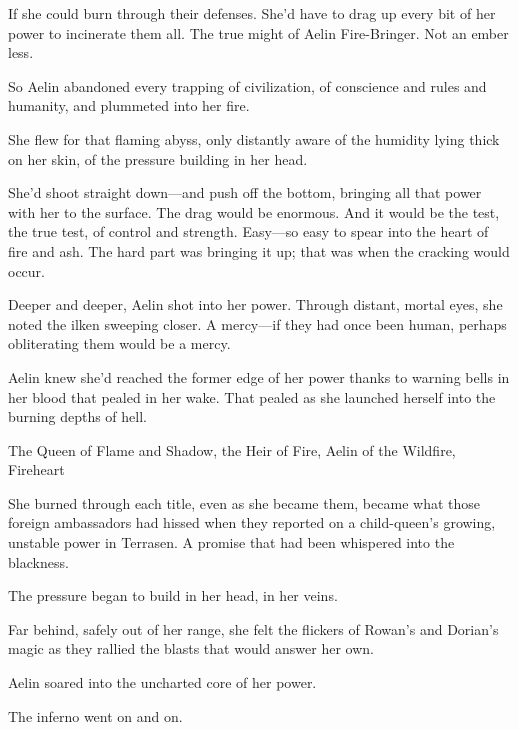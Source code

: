 If she could burn through their defenses.
She'd have to drag up every bit of her power to incinerate them all.
The true might of Aelin Fire-Bringer.
Not an ember less.

So Aelin abandoned every trapping of civilization, of conscience and rules and humanity, and plummeted into her fire.

She flew for that flaming abyss, only distantly aware of the humidity lying thick on her skin, of the pressure building in her head.

She'd shoot straight down---and push off the bottom, bringing all that power with her to the surface.
The drag would be enormous.
And it would be the test, the true test, of control and strength.
Easy---so easy to spear into the heart of fire and ash.
The hard part was bringing it up;
that was when the cracking would occur.

Deeper and deeper, Aelin shot into her power.
Through distant, mortal eyes, she noted the ilken sweeping closer.
A mercy---if they had once been human, perhaps obliterating them would be a mercy.

Aelin knew she'd reached the former edge of her power thanks to warning bells in her blood that pealed in her wake.
That pealed as she launched herself into the burning depths of hell.

The Queen of Flame and Shadow, the Heir of Fire, Aelin of the Wildfire, Fireheart 

She burned through each title, even as she became them, became what those foreign ambassadors had hissed when they reported on a child-queen's growing, unstable power in Terrasen.
A promise that had been whispered into the blackness.

The pressure began to build in her head, in her veins.

Far behind, safely out of her range, she felt the flickers of Rowan's and Dorian's magic as they rallied the blasts that would answer her own.

Aelin soared into the uncharted core of her power.

The inferno went on and on.
